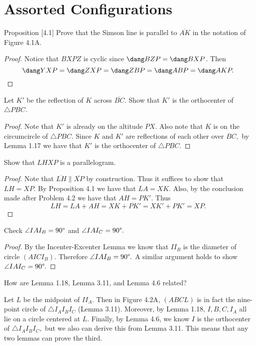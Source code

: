\documentclass[letterpaper,oneside]{scrartcl}
\providecommand{\ol}{\overline}
\begin{document}
\section{Assorted Configurations}
\begin{proposition*}
  Proposition [4.1]
  Prove that the Simson line is parallel to $\ol{AK}$ in the notation of Figure 4.1A.
\end{proposition*}
\begin{proof}
  Notice that $BXPZ$ is cyclic since $\dang BZP = \dang BXP$. Then
  $$\dang YXP = \dang ZXP = \dang ZBP  = \dang ABP = \dang AKP.$$
\end{proof}
\begin{problem*}
  [4.2]
  Let $K'$ be the reflection of $K$ across $\ol{BC}$. Show that $K'$ is the orthocenter of $\triangle PBC$. 
\end{problem*}
\begin{proof}
  Note that $K'$ is already on the altitude $PX.$ Also note that $K$ is on the circumcircle of $\triangle PBC.$ Since $K$ and $K'$ are reflections of each other over $BC,$ by Lemma 1.17 we have that $K'$ is the orthocenter of $\triangle PBC.$
\end{proof}
\begin{problem*}
  [4.3]
  Show that $LHXP$ is a parallelogram.
\end{problem*}
\begin{proof}
  Note that $\ol{LH} \parallel \ol{XP}$ by construction. Thus it suffices to show that $LH = XP.$ By Proposition 4.1 we have that $LA = XK.$ Also, by the conclusion made after Problem 4.2 we have that $AH = PK'.$ Thus
  $$LH = LA + AH = XK + PK' = XK' + PK' = XP.$$
\end{proof}

\begin{problem*}
  [4.5]
  Check $\angle IAI_B = 90\degree$ and $\angle IAI_C = 90\degree.$
\end{problem*}
\begin{proof}
  By the Incenter-Excenter Lemma we know that $II_B$ is the diameter of circle $(AICI_B)$. Therefore $\angle IAI_B = 90\degree.$ A similar argument holds to show $\angle IAI_C = 90\degree.$
\end{proof}

\begin{problem*}
  [4.7]
  How are Lemma 1.18, Lemma 3.11, and Lemma 4.6 related?
\end{problem*}
Let $L$ be the midpoint of $II_A.$ Then in Figure 4.2A, $(ABCL)$ is in fact the nine-point circle of $\triangle I_AI_BI_C$ (Lemma 3.11). Moreover, by Lemma 1.18, $I,B,C,I_A$ all lie on a circle centered at $L.$ Finally, by Lemma 4.6, we know $I$ is the orthocenter of $\triangle I_AI_BI_C,$ but we also can derive this from Lemma 3.11. This means that any two lemmas can prove the third.
\end{document}
